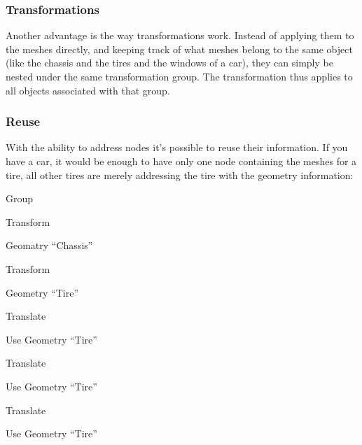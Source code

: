 \subsubsection{Transformations}\label{transformations}

Another advantage is the way transformations work. Instead of applying
them to the meshes directly, and keeping track of what meshes belong to
the same object (like the chassis and the tires and the windows of a
car), they can simply be nested under the same transformation group. The
transformation thus applies to all objects associated with that group.

\subsubsection{Reuse}\label{reuse}

With the ability to address nodes it's possible to reuse their
information. If you have a car, it would be enough to have only one node
containing the meshes for a tire, all other tires are merely addressing
the tire with the geometry information:

\begin{itemize*}
\item
  Group
\item
  Transform

  \begin{itemize*}
  \item
    Geomatry ``Chassis''
  \end{itemize*}
\item
  Transform

  \begin{itemize*}
  \item
    Geometry ``Tire''
  \end{itemize*}
\item
  Translate

  \begin{itemize*}
  \item
    Use Geometry ``Tire''
  \end{itemize*}
\item
  Translate

  \begin{itemize*}
  \item
    Use Geometry ``Tire''
  \end{itemize*}
\item
  Translate

  \begin{itemize*}
  \item
    Use Geometry ``Tire''
  \end{itemize*}
\end{itemize*}

